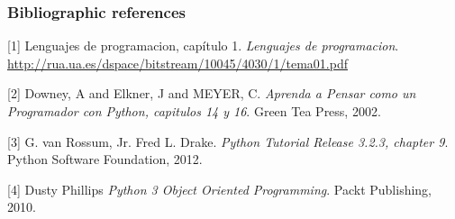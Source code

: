\documentclass[10pt,compress]{beamer} %
\begin{document}
\begin{frame}
  \frametitle<presentation>{Bibliographic references}

  \begin{thebibliography}{2}
  
  \beamertemplatebookbibitems
  
   [1]
    Lenguajes de programacion, capítulo 1.
    \newblock \emph{Lenguajes de programacion}.
  \newblock \url{http://rua.ua.es/dspace/bitstream/10045/4030/1/tema01.pdf}
  
   [2]
   Downey, A and Elkner, J and MEYER, C.
    \newblock \emph{Aprenda a Pensar como un Programador con Python, capitulos 14 y 16}.
    \newblock Green Tea Press, 2002.
    
    [3]
    G. van Rossum, Jr. Fred L. Drake.
    \newblock \emph{Python Tutorial Release 3.2.3, chapter 9}.
    \newblock Python Software Foundation, 2012. 
    
     [4]
    Dusty Phillips
    \newblock \emph{Python 3 Object Oriented Programming}.
    \newblock Packt Publishing, 2010.
   
  \end{thebibliography}
\end{frame}
\end{document}
